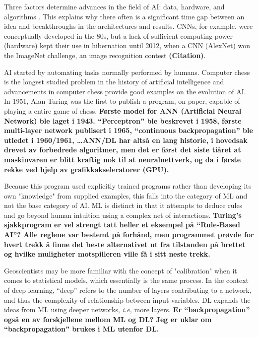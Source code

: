 \documentclass{article}
\begin{document}
Three factors determine advances in the field of AI: data, hardware, and algorithms \cite{chollet_book}. This explains why there often is a significant time gap between an idea and breakthroughs in the architectures and results. CNNs, for example, were conceptually developed in the 80s, but a lack of sufficient computing power (hardware) kept their use in hibernation until 2012, when a CNN (AlexNet) won the ImageNet challenge, an image recognition contest \textbf{(Citation)}.

AI started by automating tasks normally performed by humans. Computer chess is the longest studied problem in the history of artificial intelligence and advancements in computer chess provide good examples on the evolution of AI. In 1951, Alan Turing was the first to publish a program, on paper, capable of playing a entire game of chess. 
\textbf{Første model for ANN (Artificial Neural Network) ble laget i 1943. ``Perceptron'' ble beskrevet i 1958, første multi-layer network publisert i 1965, ``continuous backpropagation'' ble utledet i 1960/1961, \ldots ANN/DL har altså en lang historie, i hovedsak drevet av forbedrede algoritmer, men det er først det siste tiåret at maskinvaren er blitt kraftig nok til at neuralnettverk, og da i første rekke ved hjelp av grafikkakseleratorer (GPU).}

Because this program used explicitly trained programs rather than developing its own "knowledge" from supplied examples, this falls into the category of ML and not the base category of AI. ML is distinct in that it attempts to deduce rules and go beyond human intuition using a complex net of interactions. 
\textbf{Turing's sjakkprogram er vel strengt tatt heller et eksempel på ``Rule-Based AI''? Alle reglene var bestemt på forhånd, men programmet prøvde for hvert trekk å finne det beste alternativet ut fra tilstanden på brettet og hvilke muligheter motspilleren ville få i sitt neste trekk.}

Geoscientists may be more familiar with the concept of "calibration" when it comes to statistical models, which essentially is the same process. In the context of deep learning, ``deep'' refers to the number of layers contributing to a network, and thus the complexity of relationship between input variables. DL expands the ideas from ML using deeper networks, \textit{i.e,} more layers.
\textbf{Er ``backpropagation'' også en av forskjellene mellom ML og DL? Jeg er uklar om ``backpropagation'' brukes i ML utenfor DL.}
\end{document}
